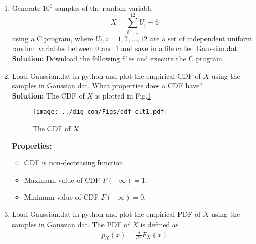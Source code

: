 \documentclass{article}
\numberwithin{equation}{subsection}
\numberwithin{figure}{subsection}
\newcommand{\solution}{\noindent \textbf{Solution: }}
\renewcommand\thesection{\arabic{section}}
\renewcommand\thesubsection{\thesection.\arabic{subsection}}
\begin{document}
\begin{enumerate}[label=\thesubsection.\arabic*,ref=\thesubsection.\arabic{figure}]
%
\item
Generate $10^6$ samples of the random variable
%
\begin{equation}
X = \sum_{i=1}^{12}U_i -6
\end{equation}
%
using a C program, where $U_i, i = 1,2,\dots, 12$ are  a set of independent uniform random variables between 0 and 1
and save in a file called Gaussian.dat \\
\solution Download the following files and execute the  C program.
\begin{center}
\end{center}
\begin{center}
\end{center}
\item
Load Gaussian.dat in python and plot the empirical CDF of $X$ using the samples in Gaussian.dat. What properties does a CDF have?
\\
\solution The CDF of $X$ is plotted in Fig.\ref{fig:gauss_cdf}
\begin{figure}
\centering
\texttt{[image: ../dig\_com/Figs/cdf\_clt1.pdf]} 
\caption{The CDF of $X$}
\label{fig:gauss_cdf}
\end{figure}
\begin{center}
\end{center}
\textbf{Properties:}
\begin{itemize}
\item CDF is non-decreasing function.
\item Maximum value of CDF $F(+\infty)=1$.
\item Minimum value of CDF $F(-\infty)=0$.
\end{itemize}
\item
Load Gaussian.dat in python and plot the empirical PDF of $X$ using the samples in Gaussian.dat. The PDF of $X$ is defined as
\begin{align}
p_{X}(x) = \frac{d}{dx}F_{X}(x)
\end{align}

\end{enumerate}
\end{document}
